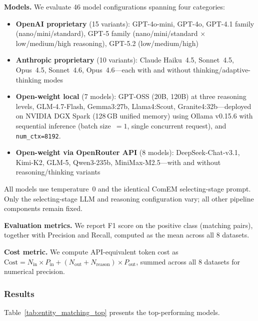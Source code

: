 \textbf{Models.}  We evaluate 46 model configurations spanning four categories:
\begin{itemize}[leftmargin=*]
    \item \textbf{OpenAI proprietary} (15 variants): GPT-4o-mini, GPT-4o, GPT-4.1 family (nano/mini/standard), GPT-5 family (nano/mini/standard $\times$ low/medium/high reasoning), GPT-5.2 (low/medium/high)
    \item \textbf{Anthropic proprietary} (10 variants): Claude Haiku~4.5, Sonnet~4.5, Opus~4.5, Sonnet~4.6, Opus~4.6---each with and without thinking/adaptive-thinking modes
    \item \textbf{Open-weight local} (7 models): GPT-OSS (20B, 120B) at three reasoning levels, GLM-4.7-Flash, Gemma3:27b, Llama4:Scout, Granite4:32b---deployed on NVIDIA DGX Spark (128\,GB unified memory) using Ollama v0.15.6 with sequential inference (batch size~$=1$, single concurrent request), and \texttt{num\_ctx=8192}.
    \item \textbf{Open-weight via OpenRouter API} (8 models): DeepSeek-Chat-v3.1, Kimi-K2, GLM-5, Qwen3-235b, MiniMax-M2.5---with and without reasoning/thinking variants
\end{itemize}

All models use temperature~0 and the identical ComEM selecting-stage prompt.  Only the selecting-stage LLM and reasoning configuration vary; all other pipeline components remain fixed.

\textbf{Evaluation metrics.}  We report F1 score on the positive class (matching pairs), together with Precision and Recall, computed as the mean across all 8 datasets. %

\textbf{Cost metric.}  We compute API-equivalent token cost as $\text{Cost} = N_{\text{in}} \times P_{\text{in}} + (N_{\text{out}} + N_{\text{reason}}) \times P_{\text{out}}$, summed across all 8 datasets for numerical precision.

\subsubsection{Results}

Table~\ref{tab:entity_matching_top} presents the top-performing models.

